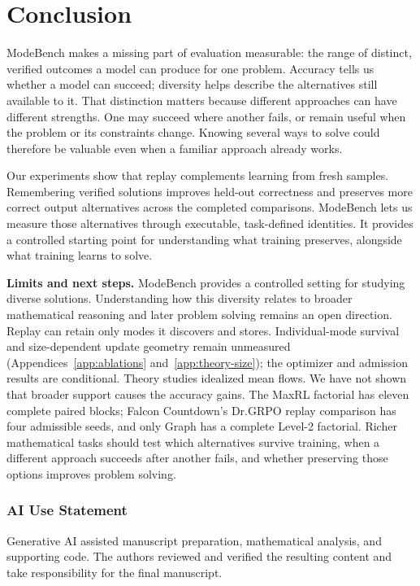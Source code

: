 \documentclass{article}
\newcommand{\1}{\mathbf 1}
\theoremstyle{remark}
\theoremstyle{definition}
\theoremstyle{plain}
\begin{document}
\section{Conclusion}
\label{sec:conclusion}
\label{sec:discussion}
\label{sec:limitations}

ModeBench makes a missing part of evaluation measurable: the range of distinct,
verified outcomes a model can produce for one problem. Accuracy tells us whether
a model can succeed; diversity helps describe the alternatives still available
to it. That distinction matters because different approaches can have different
strengths. One may succeed where another fails, or remain useful when the
problem or its constraints change. Knowing several ways to solve could therefore
be valuable even when a familiar approach already works.

Our experiments show that replay complements learning from fresh samples.
Remembering verified solutions improves held-out correctness and preserves
more correct output alternatives across the completed comparisons. ModeBench
lets us measure those alternatives through executable, task-defined identities.
It provides a controlled starting point for understanding what training
preserves, alongside what training learns to solve.

\textbf{Limits and next steps.} ModeBench provides a controlled setting for
studying diverse solutions. Understanding how this diversity relates to broader
mathematical reasoning and later problem solving remains an open direction. Replay can
retain only modes it discovers and stores. Individual-mode survival and
size-dependent update geometry remain unmeasured
(Appendices~\ref{app:ablations} and~\ref{app:theory-size}); the optimizer and
admission results are conditional. Theory studies idealized mean flows.
We have not shown that broader support
causes the accuracy gains. The MaxRL factorial has eleven complete paired
blocks; Falcon Countdown's Dr.GRPO replay comparison has four admissible seeds,
and only Graph has a complete Level-2 factorial. Richer mathematical tasks
should test which alternatives survive training, when a different approach
succeeds after another fails, and whether preserving those options improves
problem solving.

\clearpage
\subsubsection*{AI Use Statement}
\label{sec:ai-use}

Generative AI assisted manuscript preparation, mathematical analysis, and
supporting code. The authors reviewed and verified the resulting content and
take responsibility for the final manuscript.
\end{document}
